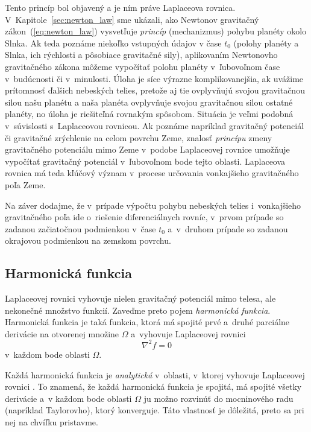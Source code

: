 \documentclass[a4paper,12pt]{book}
\begin{document}
Tento princíp bol objavený a je ním práve Laplaceova rovnica.  
V~Kapitole~\ref{sec:newton_law} sme ukázali, ako Newtonov gravitačný 
zákon~(\ref{eq:newton_law}) vysvetľuje \emph{princíp} (mechanizmus) pohybu 
planéty okolo Slnka.  Ak teda poznáme niekoľko vstupných údajov v čase $t_0$ 
(polohy planéty a Slnka, ich rýchlosti a pôsobiace gravitačné sily), 
aplikovaním Newtonovho gravitačného zákona môžeme vypočítať polohu planéty 
v~ľubovoľnom čase v~budúcnosti či v~minulosti.  Úloha je síce výrazne 
komplikovanejšia, ak uvážime prítomnosť ďalšich nebeských telies, pretože aj 
tie ovplyvňujú svojou gravitačnou silou našu planétu a naša planéta ovplyvňuje 
svojou gravitačnou silou ostatné planéty, no úloha je riešiteľná rovnakým 
spôsobom.  Situácia je veľmi podobná v~súvislosti s~Laplaceovou rovnicou.  Ak 
poznáme napríklad gravitačný potenciál či gravitačné zrýchlenie na celom 
povrchu Zeme, znalosť \emph{princípu} zmeny gravitačného potenciálu mimo Zeme 
v~podobe Laplaceovej rovnice umožňuje vypočítať gravitačný potenciál 
v~ľubovoľnom bode tejto oblasti.  Laplaceova rovnica má teda kľúčový význam 
v~procese určovania vonkajšieho gravitačného poľa Zeme.

Na záver dodajme, že v~prípade výpočtu pohybu nebeských telies i~vonkajšieho 
gravitačného poľa ide o~riešenie diferenciálnych rovníc, v~prvom prípade so 
zadanou začiatočnou podmienkou v~čase $t_0$ a~v~druhom prípade so zadanou 
okrajovou podmienkou na zemskom povrchu.




\subsection{Harmonická funkcia}

Laplaceovej rovnici vyhovuje nielen gravitačný potenciál mimo telesa, ale
nekonečné množstvo funkcií.  Zaveďme preto pojem \emph{harmonická funkcia}.
Harmonická funkcia je taká funkcia, ktorá má spojité prvé a~druhé parciálne
derivácie na otvorenej množine $\Omega$ a~vyhovuje Laplaceovej rovnici
%
\begin{equation}
\nabla^2 f = 0
\end{equation}
%
v~každom bode oblasti $\Omega$.

Každá harmonická funkcia je \emph{analytická} v~oblasti, v~ktorej vyhovuje
Laplaceovej rovnici \parencite{MoritzPhysicalGeodesy}.  To znamená, že každá
harmonická funkcia je spojitá, má spojité všetky derivácie a~v každom bode
oblasti $\Omega$ ju možno rozvinúť do mocninového radu (napríklad Taylorovho),
ktorý konverguje.  Táto vlastnosť je dôležitá, preto sa pri nej na chvíľku
pristavme.
\end{document}
